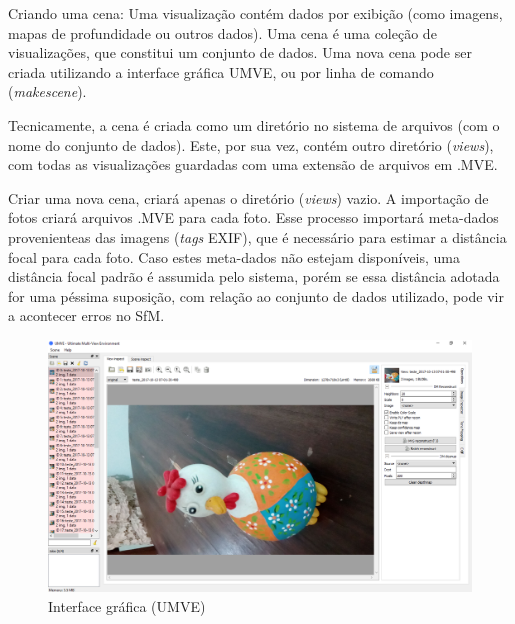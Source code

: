 Criando uma cena: Uma visualização contém dados por exibição (como imagens, mapas de profundidade ou outros dados). Uma cena é uma coleção de visualizações, que constitui um conjunto de dados. Uma nova cena pode ser criada utilizando a interface gráfica UMVE, ou por linha de comando ({\it makescene}). 

Tecnicamente, a cena é criada como um diretório no sistema de arquivos (com o nome do conjunto de dados). Este, por sua vez, contém outro diretório ({\it views}), com todas as visualizações guardadas com uma extensão de arquivos em .MVE.

Criar uma nova cena, criará apenas o diretório ({\it views}) vazio. A importação de fotos criará arquivos .MVE para cada foto. Esse processo importará meta-dados provenienteas das imagens ({\it tags} EXIF), que é necessário para estimar a distância focal para cada foto. Caso estes meta-dados não estejam disponíveis, uma distância focal padrão é assumida pelo sistema, porém se essa distância adotada for uma péssima suposição, com relação ao conjunto de dados utilizado, pode vir a acontecer erros no SfM.

\begin{figure}[!h]
	\centering
	\includegraphics[width=0.5\linewidth]{figs/umve1.png}
	\caption{%
	Interface gráfica (UMVE)%
	}\label{fig:mvesfm}
\end{figure}

